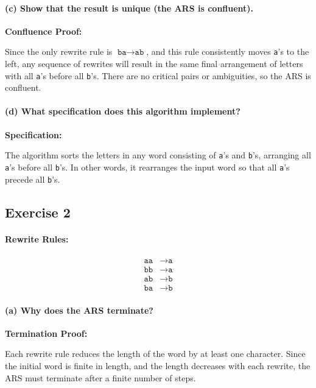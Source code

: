 \documentclass{article}
\theoremstyle{theorem}
\theoremstyle{definition}
\theoremstyle{remark}
\begin{document}
\paragraph{(c) Show that the result is unique (the ARS is confluent).}

\textbf{Confluence Proof:}

Since the only rewrite rule is \(\texttt{ba} \to \texttt{ab}\), and this rule consistently moves \texttt{a}'s to the left, any sequence of rewrites will result in the same final arrangement of letters with all \texttt{a}'s before all \texttt{b}'s. There are no critical pairs or ambiguities, so the ARS is confluent.

\paragraph{(d) What specification does this algorithm implement?}

\textbf{Specification:}

The algorithm sorts the letters in any word consisting of \texttt{a}'s and \texttt{b}'s, arranging all \texttt{a}'s before all \texttt{b}'s. In other words, it rearranges the input word so that all \texttt{a}'s precede all \texttt{b}'s.

\subsection*{Exercise 2}

\paragraph{Rewrite Rules:}

\[
\begin{aligned}
\texttt{aa} &\to \texttt{a} \\
\texttt{bb} &\to \texttt{a} \\
\texttt{ab} &\to \texttt{b} \\
\texttt{ba} &\to \texttt{b}
\end{aligned}
\]

\paragraph{(a) Why does the ARS terminate?}

\textbf{Termination Proof:}

Each rewrite rule reduces the length of the word by at least one character. Since the initial word is finite in length, and the length decreases with each rewrite, the ARS must terminate after a finite number of steps.
\end{document}
